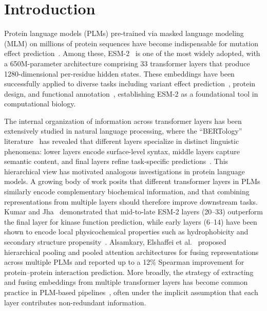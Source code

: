 \documentclass[11pt,a4paper]{article}
\begin{document}
\section{Introduction}

Protein language models (PLMs) pre-trained via masked language modeling (MLM) on
millions of protein sequences have become indispensable for mutation effect
prediction~\cite{rives2021biological,meier2021language,lin2023evolutionary}.
Among these, ESM-2~\cite{lin2023evolutionary}
is one of the most widely adopted, with a 650M-parameter architecture comprising 33
transformer layers that produce 1280-dimensional per-residue hidden states. These
embeddings have been successfully applied to diverse tasks including variant effect
prediction~\cite{frazer2021disease,hie2021learning}, protein design, and functional
annotation~\cite{elnaggar2022prottrans,brandes2022proteinbert}, establishing ESM-2 as a
foundational tool in computational biology.

The internal organization of information across transformer layers has been
extensively studied in natural language processing, where the ``BERTology''
literature~\cite{rogers2021bertology,tenney2019bert} has revealed that different layers specialize
in distinct linguistic phenomena: lower layers encode surface-level syntax, middle
layers capture semantic content, and final layers refine task-specific
predictions~\cite{nostalgebraist2020}.
This hierarchical view has motivated analogous investigations in protein language
models. A growing body of work posits that different transformer layers in PLMs
similarly encode complementary biochemical information, and that combining
representations from multiple layers should therefore improve downstream tasks.
Kumar and Jha~\cite{kumar2025} demonstrated that mid-to-late ESM-2 layers (20--33)
outperform the final layer for kinase function prediction, while early layers
(6--14) have been shown to encode local physicochemical properties such as
hydrophobicity and secondary structure propensity~\cite{detlefsen2022}.
Alsamkary, Elshaffei et al.~\cite{elshaffei2025} proposed hierarchical pooling and
pooled attention architectures for fusing representations across multiple PLMs and
reported up to a 12\% Spearman improvement for protein--protein interaction
prediction. More broadly, the strategy of extracting and fusing embeddings from
multiple transformer layers has become common practice in PLM-based
pipelines~\cite{rao2019tape}, often under the implicit assumption that each layer
contributes non-redundant information.
\end{document}
